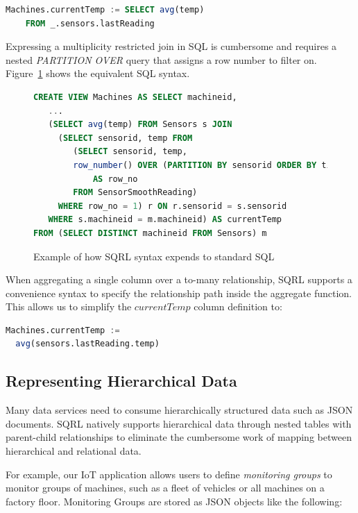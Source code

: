 \documentclass[	DIV=calc,%
							paper=letter,%
							fontsize=11pt,%
							twocolumn]{scrartcl}	 					%
\begin{document}
\begin{lstlisting}[language=SQL]
Machines.currentTemp := SELECT avg(temp)
    FROM _.sensors.lastReading
\end{lstlisting}

Expressing a multiplicity restricted join in SQL is cumbersome and requires a nested \emph{PARTITION OVER} query that assigns a row number to filter on. Figure~\ref{fig:machinesPartitionOver} shows the equivalent SQL syntax.

\begin{figure}
\begin{lstlisting}[language=SQL]
CREATE VIEW Machines AS SELECT machineid,
   ...
   (SELECT avg(temp) FROM Sensors s JOIN
     (SELECT sensorid, temp FROM
        (SELECT sensorid, temp,
        row_number() OVER (PARTITION BY sensorid ORDER BY time_min DESC)
            AS row_no
        FROM SensorSmoothReading)
     WHERE row_no = 1) r ON r.sensorid = s.sensorid
   WHERE s.machineid = m.machineid) AS currentTemp
FROM (SELECT DISTINCT machineid FROM Sensors) m
\end{lstlisting}
\caption{Example of how SQRL syntax expends to standard SQL}
\label{fig:machinesPartitionOver}
\end{figure}

When aggregating a single column over a to-many relationship, SQRL supports a convenience syntax to specify the relationship path inside the aggregate function. This allows us to simplify the $currentTemp$ column definition to:

\begin{lstlisting}[language=SQL]
Machines.currentTemp :=
  avg(sensors.lastReading.temp)
\end{lstlisting}

\subsection{Representing Hierarchical Data}

Many data services need to consume hierarchically structured data such as JSON documents. SQRL natively supports hierarchical data through nested tables with parent-child relationships to eliminate the cumbersome work of mapping between hierarchical and relational data.

For example, our IoT application allows users to define \emph{monitoring groups} to monitor groups of machines, such as a fleet of vehicles or all machines on a factory floor. Monitoring Groups are stored as JSON objects like the following:
\end{document}
